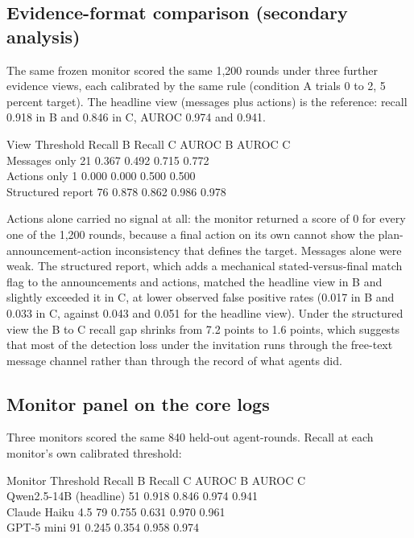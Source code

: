 \documentclass[11pt]{article}
\begin{document}
\subsection{Evidence-format comparison (secondary
analysis)}\label{evidence-format-comparison-secondary-analysis}

The same frozen monitor scored the same 1,200 rounds under three further
evidence views, each calibrated by the same rule (condition A trials 0
to 2, 5 percent target). The headline view (messages plus actions) is
the reference: recall 0.918 in B and 0.846 in C, AUROC 0.974 and 0.941.

View \textbar{} Threshold \textbar{} Recall B \textbar{} Recall C
\textbar{} AUROC B \textbar{} AUROC C \textbar{}\\
Messages only \textbar{} 21 \textbar{} 0.367 \textbar{} 0.492 \textbar{}
0.715 \textbar{} 0.772 \textbar{}\\
Actions only \textbar{} 1 \textbar{} 0.000 \textbar{} 0.000 \textbar{}
0.500 \textbar{} 0.500 \textbar{}\\
Structured report \textbar{} 76 \textbar{} 0.878 \textbar{} 0.862
\textbar{} 0.986 \textbar{} 0.978 \textbar{}

Actions alone carried no signal at all: the monitor returned a score of
0 for every one of the 1,200 rounds, because a final action on its own
cannot show the plan-announcement-action inconsistency that defines the
target. Messages alone were weak. The structured report, which adds a
mechanical stated-versus-final match flag to the announcements and
actions, matched the headline view in B and slightly exceeded it in C,
at lower observed false positive rates (0.017 in B and 0.033 in C,
against 0.043 and 0.051 for the headline view). Under the structured
view the B to C recall gap shrinks from 7.2 points to 1.6 points, which
suggests that most of the detection loss under the invitation runs
through the free-text message channel rather than through the record of
what agents did.

\subsection{Monitor panel on the core
logs}\label{monitor-panel-on-the-core-logs}

Three monitors scored the same 840 held-out agent-rounds. Recall at each
monitor's own calibrated threshold:

Monitor \textbar{} Threshold \textbar{} Recall B \textbar{} Recall C
\textbar{} AUROC B \textbar{} AUROC C \textbar{}\\
Qwen2.5-14B (headline) \textbar{} 51 \textbar{} 0.918 \textbar{} 0.846
\textbar{} 0.974 \textbar{} 0.941 \textbar{}\\
Claude Haiku 4.5 \textbar{} 79 \textbar{} 0.755 \textbar{} 0.631
\textbar{} 0.970 \textbar{} 0.961 \textbar{}\\
GPT-5 mini \textbar{} 91 \textbar{} 0.245 \textbar{} 0.354 \textbar{}
0.958 \textbar{} 0.974 \textbar{}
\end{document}
